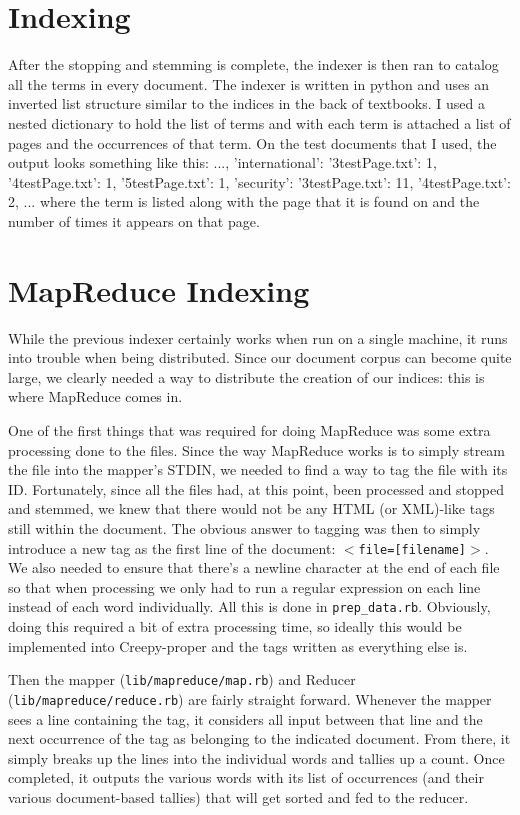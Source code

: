 \documentclass[letterpaper,11pt,twoside]{article}
\begin{document}
\section{Indexing}
After the stopping and stemming is complete, the indexer is then ran to catalog all the terms in every document. The indexer is written in python and uses an inverted list structure similar to the indices in the back of textbooks. I used a nested dictionary to hold the list of terms and with each term is attached a list of pages and the occurrences of that term.  On the test documents that I used, the output looks something like this:
{..., 'international': {'3testPage.txt': 1, '4testPage.txt': 1, '5testPage.txt': 1}, 'security': {'3testPage.txt': 11, '4testPage.txt': 2}, ...}
where the term is listed along with the page that it is found on and the number of times it appears on that page.

\section{MapReduce Indexing}
While the previous indexer certainly works when run on a single machine, it runs into trouble when being distributed. Since our document corpus can become quite large, we clearly needed a way to distribute the creation of our indices: this is where MapReduce comes in.

One of the first things that was required for doing MapReduce was some extra processing done to the files. Since the way MapReduce works is to simply stream the file into the mapper's STDIN, we needed to find a way to tag the file with its ID. Fortunately, since all the files had, at this point, been processed and stopped and stemmed, we knew that there would not be any HTML (or XML)-like tags still within the document. The obvious answer to tagging was then to simply introduce a new tag as the first line of the document: \texttt{$<$file=[filename]$>$}. We also needed to ensure that there's a newline character at the end of each file so that when processing we only had to run a regular expression on each line instead of each word individually. All this is done in \texttt{prep\_data.rb}. Obviously, doing this required a bit of extra processing time, so ideally this would be implemented into Creepy-proper and the tags written as everything else is.

Then the mapper (\texttt{lib/mapreduce/map.rb}) and Reducer (\texttt{lib/mapreduce/reduce.rb}) are fairly straight forward. Whenever the mapper sees a line containing the tag, it considers all input between that line and the next occurrence of the tag as belonging to the indicated document. From there, it simply breaks up the lines into the individual words and tallies up a count. Once completed, it outputs the various words with its list of occurrences (and their various document-based tallies) that will get sorted and fed to the reducer.
\end{document}
